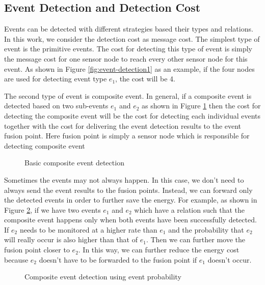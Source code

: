 \subsection{Event Detection and Detection Cost}
Events can be detected with different strategies based their types and relations. In this work, we consider the detection cost as message cost. The simplest type of event is the primitive events. The cost for detecting this type of event is simply the message cost for one sensor node to reach every other sensor node for this event. As shown in Figure \ref{fig:event-detection1} as an example, if the four nodes are used for detecting event type \(e_1\), the cost will be 4.

The second type of event is composite event. In general, if a composite event is detected based on two sub-events \(e_1\) and \(e_2\) as shown in Figure \ref{fig:event-detection2} then the cost for detecting the composite event will be the cost for detecting each individual events together with the cost for delivering the event detection results to the event fusion point. Here fusion point is simply a sensor node which is responsible for detecting composite event

\begin{figure}
\centering
{}
\caption{Basic composite event detection}
\label{fig:event-detection2}
\end{figure}

Sometimes the events may not always happen. In this case, we don't need to always send the event results to the fusion points. Instead, we can forward only the detected events in order to further save the energy. For example, as shown in Figure \ref{fig:event-detection3}, if we have two events \(e_1\) and \(e_2\) which have a relation such that the composite event happens only when both events have been successfully detected. If \(e_2\) needs to be monitored at a higher rate than \(e_1\) and the probability that \(e_2\) will really occur is also higher than that of \(e_1\). Then we can further move the fusion point closer to \(e_2\). In this way, we can further reduce the energy cost because \(e_2\) doesn't have to be forwarded to the fusion point if \(e_1\) doesn't occur.

\begin{figure}
\centering
{}
\caption{Composite event detection using event probability}
\label{fig:event-detection3}
\end{figure}

